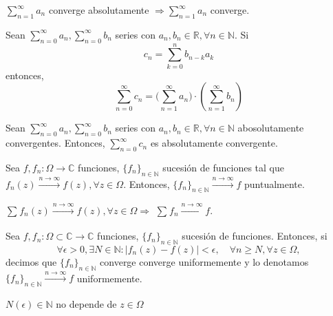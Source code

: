 \begin{obs}
  $\sum_{n = 1}^{\infty} a_{n}$ converge absolutamente $\Rightarrow \sum_{n = 1}^{\infty} a_{n}$ converge.
\end{obs}

\begin{prop}
  Sean $\sum_{n = 0}^{\infty} a_{n}, \sum_{n = 0}^{\infty} b_{n}$ series con $a_{n}, b_{n} \in \mathbb{R}, \forall n \in \mathbb{N}$. Si
  \[ 
    c_{n} = \sum_{k = 0}^{n} b_{n -k} a_{k}
  \] 
  entonces,
  \[ 
    \sum_{n = 0}^{\infty} c_{n} = \big ( \sum_{n = 1}^{\infty} a_{n} \big ) \cdot ( \sum_{n = 1}^{\infty} b_{n} )
  \] 
\end{prop}

\begin{prop}
  Sean $\sum_{n = 0}^{\infty} a_{n}, \sum_{n = 0}^{\infty} b_{n}$ series con $a_{n}, b_{n} \in \mathbb{R}, \forall n \in \mathbb{N}$ abosolutamente convergentes. Entonces, $\sum_{n = 0}^{\infty} c_{n}$ es absolutamente convergente.
\end{prop}

\begin{defn}
  Sea $f, f_{n}: \Omega \to \mathbb{C}$ funciones, $\{ f_{n} \}_{n \in \mathbb{N}}$ sucesión de funciones tal que $f_{n}(z) \xrightarrow[]{ n \rightarrow \infty } f(z), \forall z \in \Omega$. Entonces, $\{ f_{n} \}_{n \in \mathbb{N}} \xrightarrow[]{ n \rightarrow \infty } f$ puntualmente.
\end{defn}

\begin{obs}
  $\sum_{}^{} f_{n}(z) \xrightarrow[]{ n \rightarrow \infty } f(z), \forall z \in \Omega \Rightarrow$ $\sum_{}^{} f_{n} \xrightarrow[]{ n \rightarrow  \infty } f$.
\end{obs}

\begin{defn}
  Sea $f,f_{n}: \Omega \subset \mathbb{C} \to \mathbb{C}$ funciones, $\{ f_{n} \}_{n \in \mathbb{N}}$ sucesión de funciones. Entonces, si
  \[ 
    \forall \epsilon >0, \exists N \in \mathbb{N}: | f_{n}(z) - f(z) | < \epsilon, \quad \forall n \geq N, \forall z \in \Omega,
  \] 
  decimos que $\{ f_{n} \}_{n \in \mathbb{N}}$ converge converge uniformemente y lo denotamos $\{ f_{n} \}_{n \in \mathbb{N}} \xrightarrow[]{ n \rightarrow \infty } f$ uniformemente.
\end{defn}

\begin{obs}
  $N(\epsilon) \in \mathbb{N}$ no depende de $z \in \Omega$
\end{obs}

